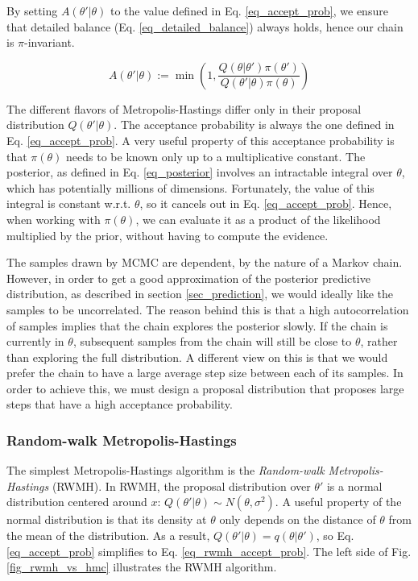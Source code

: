 \documentclass[12pt]{article}
\begin{document}
{By setting $A(\theta'|\theta)$ to the value defined in Eq. \ref{eq_accept_prob}, we ensure that detailed balance (Eq. \ref{eq_detailed_balance}) always holds, hence our chain is $\pi$-invariant. 

\begin{equation}
A(\theta'|\theta) := \min \left(1, \frac{Q(\theta|\theta')\pi(\theta')}{Q(\theta'|\theta)\pi(\theta)} \right)
\label{eq_accept_prob}
\end{equation}

The different flavors of Metropolis-Hastings differ only in their proposal distribution $Q(\theta'|\theta)$. The acceptance probability is always the one defined in Eq. \ref{eq_accept_prob}. A very useful property of this acceptance probability is that $\pi(\theta)$ needs to be known only up to a multiplicative constant. The posterior, as defined in Eq. \ref{eq_posterior} involves an intractable integral over $\theta$, which has potentially millions of dimensions. Fortunately, the value of this integral is constant w.r.t. $\theta$, so it cancels out in Eq. \ref{eq_accept_prob}. Hence, when working with $\pi(\theta)$, we can evaluate it as a product of the likelihood multiplied by the prior, without having to compute the evidence.

The samples drawn by MCMC are dependent, by the nature of a Markov chain. However, in order to get a good approximation of the posterior predictive distribution, as described in section \ref{sec_prediction}, we would ideally like the samples to be uncorrelated. The reason behind this is that a high autocorrelation of samples implies that the chain explores the posterior slowly. If the chain is currently in $\theta$, subsequent samples from the chain will still be close to $\theta$, rather than exploring the full distribution. A different view on this is that we would prefer the chain to have a large average step size between each of its samples. In order to achieve this, we must design a proposal distribution that proposes large steps that have a high acceptance probability.

\subsubsection{Random-walk Metropolis-Hastings}

The simplest Metropolis-Hastings algorithm is the \textit{Random-walk Metropolis-Hastings} (RWMH). In RWMH, the proposal distribution over $\theta'$ is a normal distribution centered around $x$: $Q(\theta'|\theta) \sim N(\theta, \sigma^2)$. A useful property of the normal distribution is that its density at $\theta$ only depends on the distance of $\theta$ from the mean of the distribution. As a result, $Q(\theta'|\theta) = q(\theta|\theta')$, so Eq. \ref{eq_accept_prob} simplifies to Eq. \ref{eq_rwmh_accept_prob}. The left side of Fig. \ref{fig_rwmh_vs_hmc} illustrates the RWMH algorithm.

}
\end{document}
